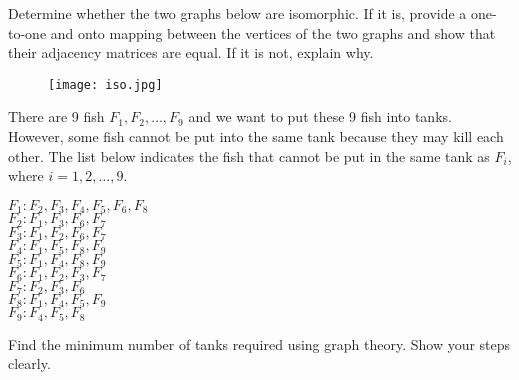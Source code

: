 \documentclass[letterpaper,9pt,addpoints]{exam}
\begin{document}


\newpage
\begin{questions}

\question[25]Determine whether the two graphs below are isomorphic. If it is, provide a one-to-one and onto mapping between the vertices of the two graphs and show that their adjacency matrices are equal. If it is not, explain why.
\begin{figure}[htbp] %
  \center
  \texttt{[image: iso.jpg]}
  \end{figure}

\newpage
\question[25]
There are 9 fish $F_1,F_2,\dots,F_{9}$ and we want to put these 9 fish into tanks. However, some fish cannot be put into the same tank because they may kill each other. The list below indicates the fish that cannot be put in the same tank as $F_i$, where $i=1,2,\dots,9$.

$F_1: F_2, F_3, F_4, F_5, F_6, F_8$\\
$F_2:F_1,F_3,F_6,F_7$\\
$F_3:F_1,F_2,F_6,F_7$ \\
$F_4: F_1, F_5, F_8, F_9$\\
$F_5:F_1,F_4,F_8,F_9$\\
$F_6:F_1,F_2,F_3,F_7$\\
$F_7: F_2, F_3, F_6$\\
$F_8:F_1,F_4,F_5,F_9$\\
$F_9:F_4,F_5,F_8$



 Find the minimum number of tanks required using graph theory. Show your steps clearly.


\end{questions}
\end{document}
